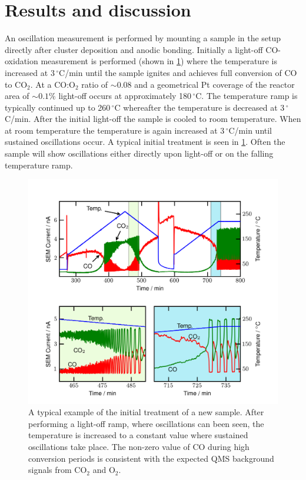 \documentclass[journal=jacsat,manuscript=article]{achemso}
\begin{document}
\section{Results and discussion}
An oscillation measurement is performed by mounting a sample in the setup
directly after cluster deposition and anodic bonding. Initially a light-off
CO-oxidation measurement is performed (shown in \ref{fgr:initial_treatment}) where
the temperature is increased at 3\,$^\circ$C/min until the sample ignites and
achieves full conversion of CO to CO$_2$. At a CO:O$_2$ ratio of $\sim0.08$ and a
geometrical Pt coverage of the reactor area of $\sim0.1\%$ light-off occurs at approximately
180\,$^\circ$C. The temperature ramp is typically continued up to
260\,$^\circ$C whereafter the temperature is decreased at 3\,$^\circ$C/min.
After the initial light-off the sample is cooled to room
temperature. When at room temperature the temperature is again increased at
3\,$^\circ$C/min until sustained oscillations occur. A typical initial
treatment is seen in \ref{fgr:initial_treatment}. Often the sample will
show oscillations either directly upon light-off or on the falling temperature
ramp.

\begin{figure}
  \includegraphics[width=12cm]{initial_treatment.png} 
  \caption{A typical example of the initial treatment of a new sample. After
  performing a light-off ramp, where oscillations can been seen, the temperature
  is increased to a constant value where sustained oscillations take place. The
  non-zero value of CO during high conversion periods is consistent with the
  expected QMS background signals from CO$_2$ and O$_2$.}
  \label{fgr:initial_treatment}
\end{figure}
\end{document}
